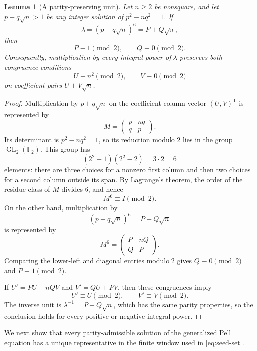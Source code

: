 \documentclass[a4paper,11pt]{amsart}
\newtheorem{lemma}[lemma]{Lemma}
\theoremstyle{definition}
\theoremstyle{remark}
\begin{document}
\begin{lemma}[A parity-preserving unit]\label{lem:parity-unit}
Let $n\ge2$ be nonsquare, and let $p+q\sqrt n>1$ be any integer solution of $p^2-nq^2=1$.  If
\[
\lambda=(p+q\sqrt n)^6=P+Q\sqrt n,
\]
then
\[
P\equiv1\pmod2,
\qquad Q\equiv0\pmod2.
\]
Consequently, multiplication by every integral power of $\lambda$ preserves both congruence conditions
\[
U\equiv n^2\pmod2,
\qquad V\equiv0\pmod2
\]
on coefficient pairs $U+V\sqrt n$.
\end{lemma}

\begin{proof}
Multiplication by $p+q\sqrt n$ on the coefficient column vector $(U,V)^{\mathsf T}$ is represented by
\[
M=\begin{pmatrix}p&nq\\q&p\end{pmatrix}.
\]
Its determinant is $p^2-nq^2=1$, so its reduction modulo $2$ lies in the group $\operatorname{GL}_2(\mathbb F_2)$.  This group has
\[
(2^2-1)(2^2-2)=3\cdot2=6
\]
elements: there are three choices for a nonzero first column and then two choices for a second column outside its span.  By Lagrange's theorem, the order of the residue class of $M$ divides $6$, and hence
\[
M^6\equiv I\pmod2.
\]
On the other hand, multiplication by
\[
(p+q\sqrt n)^6=P+Q\sqrt n
\]
is represented by
\[
M^6=\begin{pmatrix}P&nQ\\Q&P\end{pmatrix}.
\]
Comparing the lower-left and diagonal entries modulo $2$ gives $Q\equiv0\pmod2$ and $P\equiv1\pmod2$.

If $U'=PU+nQV$ and $V'=QU+PV$, then these congruences imply
\[
U'\equiv U\pmod2,
\qquad V'\equiv V\pmod2.
\]
The inverse unit is $\lambda^{-1}=P-Q\sqrt n$, which has the same parity properties, so the conclusion holds for every positive or negative integral power.
\end{proof}

We next show that every parity-admissible solution of the generalized Pell equation has a unique representative in the finite window used in \eqref{eq:seed-set}.
\end{document}
